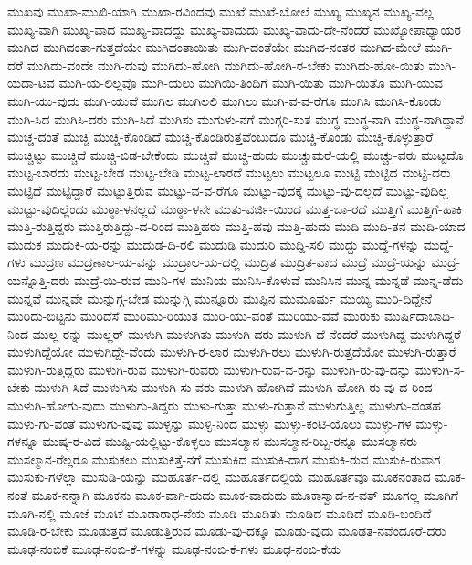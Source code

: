 {ಮುಖವು
ಮುಖಾ-ಮುಖಿ-ಯಾಗಿ
ಮುಖಾ-ರವಿಂದವು
ಮುಖೆ
ಮುಖೆ-ಬೋಲೆ
ಮುಖ್ಯ
ಮುಖ್ಯನ
ಮುಖ್ಯ-ವಲ್ಲ
ಮುಖ್ಯ-ವಾಗಿ
ಮುಖ್ಯ-ವಾದ
ಮುಖ್ಯ-ವಾದದ್ದು
ಮುಖ್ಯ-ವಾದುದು
ಮುಖ್ಯ-ವಾದು-ದೇ-ನೆಂದರೆ
ಮುಖ್ಯೋಪಾಧ್ಯಾಯರ
ಮುಗಿದ
ಮುಗಿದಂತಾ-ಗುತ್ತದೆಯೇ
ಮುಗಿದಂತಾಯಿತು
ಮುಗಿ-ದಂತೆಯೇ
ಮುಗಿದ-ನಂತರ
ಮುಗಿದ-ಮೇಲೆ
ಮುಗಿ-ದರೆ
ಮುಗಿದು-ವಂದೇ
ಮುಗಿ-ದುವು
ಮುಗಿದು-ಹೋಗಿ
ಮುಗಿದು-ಹೋಗಿ-ರ-ಬೇಕು
ಮುಗಿದು-ಹೋ-ಯಿತು
ಮುಗಿ-ಯದಾ-ಟವ
ಮುಗಿ-ಯ-ಲಿಲ್ಲವೊ
ಮುಗಿ-ಯಲು
ಮುಗಿಯಿ-ತಿಂದಿಗೆ
ಮುಗಿ-ಯಿತು
ಮುಗಿ-ಯಿತೊ
ಮುಗಿ-ಯುವ
ಮುಗಿ-ಯು-ವುದು
ಮುಗಿ-ಯುವೆ
ಮುಗಿಲ
ಮುಗಿಲಲಿ
ಮುಗಿಲು
ಮುಗಿ-ವ-ವ-ರೆಗೂ
ಮುಗಿಸಿ
ಮುಗಿಸಿ-ಕೊಂಡು
ಮುಗಿ-ಸಿದ
ಮುಗಿಸಿ-ದರು
ಮುಗಿ-ಸಿದೆ
ಮುಗಿಸು
ಮುಗುಳು-ನಗೆ
ಮುಗ್ಗರಿ-ಸುತ
ಮುಗ್ಧ
ಮುಗ್ಧ-ನಾಗಿ
ಮುಗ್ಧ-ನಾಗಿದ್ದಾನೆ
ಮುಚ್ಚ-ದಂತೆ
ಮುಚ್ಚಿ
ಮುಚ್ಚಿ-ಕೊಂಡಿದೆ
ಮುಚ್ಚಿ-ಕೊಂಡಿರುತ್ತವೆಂಬುದೂ
ಮುಚ್ಚಿ-ಕೊಂಡು
ಮುಚ್ಚಿ-ಕೊಳ್ಳುತ್ತಾರೆ
ಮುಚ್ಚಿಟ್ಟು
ಮುಚ್ಚಿದೆ
ಮುಚ್ಚಿ-ಬಿಡ-ಬೇಕೆಂದು
ಮುಚ್ಚಿವೆ
ಮುಚ್ಚಿ-ಹುದು
ಮುಚ್ಚುಮರೆ-ಯಲ್ಲಿ
ಮುಚ್ಚು-ವರು
ಮುಟ್ಟದೊ
ಮುಟ್ಟ-ಬಾರದು
ಮುಟ್ಟ-ಬೇಡ
ಮುಟ್ಟ-ಬೇಡಿ
ಮುಟ್ಟ-ಲಾರದೆ
ಮುಟ್ಟಲು
ಮುಟ್ಟಲೂ
ಮುಟ್ಟಿ
ಮುಟ್ಟಿದ
ಮುಟ್ಟಿ-ದರು
ಮುಟ್ಟಿದೆ
ಮುಟ್ಟಿದ್ದಾರೆ
ಮುಟ್ಟುತ್ತಿರುವ
ಮುಟ್ಟು-ವ-ವ-ರೆಗೂ
ಮುಟ್ಟು-ವುದಕ್ಕೆ
ಮುಟ್ಟು-ವು-ದಲ್ಲದೆ
ಮುಟ್ಟು-ವುದಿಲ್ಲ
ಮುಟ್ಟು-ವುದಿಲ್ಲೆಂದು
ಮುಠ್ಠಾ-ಳನಲ್ಲದೆ
ಮುಠ್ಠಾ-ಳನೇ
ಮುತು-ವರ್ಜಿ-ಯಿಂದ
ಮುತ್ತ-ಬಾ-ರದೆ
ಮುತ್ತಿಗೆ
ಮುತ್ತಿಗೆ-ಹಾಕಿ
ಮುತ್ತಿ-ರುತ್ತಿದ್ದರು
ಮುತ್ತಿರುತ್ತಿದ್ದು-ದ-ರಿಂದ
ಮುತ್ತಿಹರು
ಮುತ್ತಿ-ಹವು
ಮುತ್ತಿ-ಹುದು
ಮುದಿ
ಮುದಿ-ತನ
ಮುದಿ-ಯಾದ
ಮುದುಕ
ಮುದುಕಿ-ಯ-ರನ್ನು
ಮುದುಡ-ದಿ-ರಲಿ
ಮುದುಡಿ
ಮುದುರಿ
ಮುದ್ದಿ-ಸಲಿ
ಮುದ್ದು
ಮುದ್ದೆ-ಗಳನ್ನು
ಮುದ್ದೆ-ಗಳು
ಮುದ್ರಣ
ಮುದ್ರಣಾಲ-ಯ-ವನ್ನು
ಮುದ್ರಾಲ-ಯ-ದಲ್ಲಿ
ಮುದ್ರಿತ
ಮುದ್ರಿತ-ವಾದ
ಮುದ್ರೆ
ಮುದ್ರೆ-ಯನ್ನು
ಮುದ್ರೆ-ಯನ್ನೊತ್ತಿ-ದರು
ಮುದ್ರೆ-ಯಿ-ರುವ
ಮುನಿ-ಗಳ
ಮುನಿಯ
ಮುನಿಸಿ-ಕೊಳುವೆ
ಮುನಿಸಿನ
ಮುನ್ನ
ಮುನ್ನಡೆ
ಮುನ್ನ-ಡೆದು
ಮುನ್ನವೆ
ಮುನ್ನವೇ
ಮುನ್ನುಗ್ಗ-ಬೇಡ
ಮುನ್ನುಗ್ಗಿ
ಮುನ್ನೂರು
ಮುಪ್ಪಿನ
ಮುಮೂರ್ಷು
ಮುಯ್ಯಿ
ಮುರಿ-ದಿದ್ದೇನೆ
ಮುರಿದು-ಬಿಟ್ಟನು
ಮುರಿದೆಸೆ
ಮುರಿಮು-ರಿಯುತ
ಮುರಿ-ಯು-ವಂತೆ
ಮುರಿಯು-ವವೆ
ಮುರುಕು
ಮುರ್ಷಿದಾಬಾದಿ-ನಿಂದ
ಮುಲ್ಲ-ರನ್ನು
ಮುಲ್ಲರ್
ಮುಳುಗಿ
ಮುಳುಗಿತು
ಮುಳುಗಿ-ದರು
ಮುಳುಗಿ-ದೆ-ನೆಂದರೆ
ಮುಳುಗಿದ್ದ
ಮುಳುಗಿದ್ದರೆ
ಮುಳುಗಿದ್ದೆಯೋ
ಮುಳುಗಿದ್ದೇ-ವೆಂದು
ಮುಳುಗಿ-ರ-ಲಾರ
ಮುಳುಗಿ-ರಲು
ಮುಳುಗಿ-ರುತ್ತದೆಯೋ
ಮುಳುಗಿ-ರುತ್ತಾರೆ
ಮುಳುಗಿ-ರುತ್ತಿದ್ದರು
ಮುಳುಗಿ-ರುವ
ಮುಳುಗಿ-ರುವರು
ಮುಳುಗಿ-ರುವ-ವ-ರನ್ನು
ಮುಳುಗಿ-ರು-ವು-ದನ್ನು
ಮುಳುಗಿ-ಸ-ಬೇಕು
ಮುಳುಗಿ-ಸಿದೆ
ಮುಳುಗಿಸು
ಮುಳುಗಿ-ಸು-ವರು
ಮುಳುಗಿ-ಹೋಗಿದೆ
ಮುಳುಗಿ-ಹೋಗಿ-ರು-ವು-ದ-ರಿಂದ
ಮುಳುಗಿ-ಹೋಗು-ವುದು
ಮುಳುಗು-ತಿದ್ದರು
ಮುಳು-ಗುತ್ತಾ
ಮುಳು-ಗುತ್ತಾನೆ
ಮುಳುಗುತ್ತಿಲ್ಲ
ಮುಳುಗು-ವಂತಹ
ಮುಳು-ಗು-ವಂತೆ
ಮುಳುಗು-ವುವು
ಮುಳ್ಳನ್ನು
ಮುಳ್ಳಿ-ನಿಂದ
ಮುಳ್ಳು
ಮುಳ್ಳು-ಕಂಟಿ-ಯೊಲು
ಮುಳ್ಳು-ಗಳ
ಮುಳ್ಳು-ಗಳನ್ನೂ
ಮುಷ್ಕ-ರ-ವಿದೆ
ಮುಷ್ಟಿ-ಯಲ್ಲಿಟ್ಟು-ಕೊಳ್ಳಲು
ಮುಸಲ್ಮಾನ
ಮುಸಲ್ಮಾನ-ರಿಬ್ಬ-ರನ್ನೂ
ಮುಸಲ್ಮಾನರು
ಮುಸಲ್ಮಾನ-ರೆಲ್ಲರೂ
ಮುಸುಕಲು
ಮುಸುಕಿತ್ತೆ-ನಗೆ
ಮುಸುಕಿದ
ಮುಸುಕಿ-ದಾಗ
ಮುಸುಕಿ-ರುವ
ಮುಸುಕಿ-ರುವಾಗ
ಮುಸುಕು-ಗಳೆಲ್ಲಾ
ಮುಸುಡಿ-ಯನ್ನು
ಮುಹೂರ್ತ-ದಲ್ಲಿ
ಮುಹೂರ್ತದಲ್ಲಿಯೆ
ಮುಹೂರ್ತವೂ
ಮೂಕನಂತಾದ
ಮೂಕ-ನಂತೆ
ಮೂಕ-ನನ್ನಾಗಿ
ಮೂಕನು
ಮೂಕ-ವಾಗಿ-ಹುದು
ಮೂಕ-ವಾದುದು
ಮೂಕಾಸ್ವಾದ-ನ-ವತ್
ಮೂಗಲ್ಲ
ಮೂಗಿಗೆ
ಮೂಗಿ-ನಲ್ಲಿ
ಮೂಜೆ
ಮೂಟೆ
ಮೂಡಾರಾಧ-ನೆಯ
ಮೂಡಿ
ಮೂಡಿತು
ಮೂಡಿದ
ಮೂಡಿದೆ
ಮೂಡಿ-ಬಂದಿದೆ
ಮೂಡಿ-ರ-ಬೇಕು
ಮೂಡುತ್ತದೆ
ಮೂಡುತ್ತಿರುವ
ಮೂಡು-ವು-ದಕ್ಕೂ
ಮೂಡು-ವುದು
ಮೂಢತ-ನವೆಂದೂರೆ-ದರು
ಮೂಢ-ನಂಬಿಕೆ
ಮೂಢ-ನಂಬಿ-ಕೆ-ಗಳನ್ನು
ಮೂಢ-ನಂಬಿ-ಕೆ-ಗಳು
ಮೂಢ-ನಂಬಿ-ಕೆಯ
}
